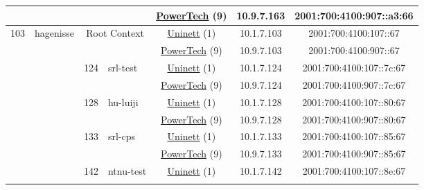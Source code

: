 \begin{small}
\begin{center}
\begin{longtable}{|c|c|c|c|c|c|c|c|}
  &  &  &  & \multicolumn{2}{|c|}{\tiny{\href{http://www.powertech.no}{PowerTech} (9)}} & \tiny{10.9.7.163} & \tiny{2001:700:4100:907::a3:66} \\ \hline
 \multirow{24}{*}{\tiny{103}} & \multicolumn{1}{|l|}{\multirow{24}{*}{\tiny{hagenisse}}} & \multicolumn{2}{|c|}{\multirow{2}{*}{\tiny{Root Context}}} & \multicolumn{2}{|c|}{\tiny{\href{https://www.uninett.no}{Uninett} (1)}} & \tiny{10.1.7.103} & \tiny{2001:700:4100:107::67} \\* \cline{5-5}\cline{6-6}\cline{7-7}\cline{8-8}
  &  & \multicolumn{2}{|c|}{} & \multicolumn{2}{|c|}{\tiny{\href{http://www.powertech.no}{PowerTech} (9)}} & \tiny{10.9.7.103} & \tiny{2001:700:4100:907::67} \\* \cline{3-3}\cline{4-4}\cline{5-5}\cline{6-6}\cline{7-7}\cline{8-8}
  &  & \multirow{2}{*}{\tiny{124}} & \multicolumn{1}{|l|}{\multirow{2}{*}{\tiny{srl-test}}} & \multicolumn{2}{|c|}{\tiny{\href{https://www.uninett.no}{Uninett} (1)}} & \tiny{10.1.7.124} & \tiny{2001:700:4100:107::7c:67} \\* \cline{5-5}\cline{6-6}\cline{7-7}\cline{8-8}
  &  &  &  & \multicolumn{2}{|c|}{\tiny{\href{http://www.powertech.no}{PowerTech} (9)}} & \tiny{10.9.7.124} & \tiny{2001:700:4100:907::7c:67} \\* \cline{3-3}\cline{4-4}\cline{5-5}\cline{6-6}\cline{7-7}\cline{8-8}
  &  & \multirow{2}{*}{\tiny{128}} & \multicolumn{1}{|l|}{\multirow{2}{*}{\tiny{hu-luiji}}} & \multicolumn{2}{|c|}{\tiny{\href{https://www.uninett.no}{Uninett} (1)}} & \tiny{10.1.7.128} & \tiny{2001:700:4100:107::80:67} \\* \cline{5-5}\cline{6-6}\cline{7-7}\cline{8-8}
  &  &  &  & \multicolumn{2}{|c|}{\tiny{\href{http://www.powertech.no}{PowerTech} (9)}} & \tiny{10.9.7.128} & \tiny{2001:700:4100:907::80:67} \\* \cline{3-3}\cline{4-4}\cline{5-5}\cline{6-6}\cline{7-7}\cline{8-8}
  &  & \multirow{2}{*}{\tiny{133}} & \multicolumn{1}{|l|}{\multirow{2}{*}{\tiny{srl-cps}}} & \multicolumn{2}{|c|}{\tiny{\href{https://www.uninett.no}{Uninett} (1)}} & \tiny{10.1.7.133} & \tiny{2001:700:4100:107::85:67} \\* \cline{5-5}\cline{6-6}\cline{7-7}\cline{8-8}
  &  &  &  & \multicolumn{2}{|c|}{\tiny{\href{http://www.powertech.no}{PowerTech} (9)}} & \tiny{10.9.7.133} & \tiny{2001:700:4100:907::85:67} \\* \cline{3-3}\cline{4-4}\cline{5-5}\cline{6-6}\cline{7-7}\cline{8-8}
  &  & \multirow{2}{*}{\tiny{142}} & \multicolumn{1}{|l|}{\multirow{2}{*}{\tiny{ntnu-test}}} & \multicolumn{2}{|c|}{\tiny{\href{https://www.uninett.no}{Uninett} (1)}} & \tiny{10.1.7.142} & \tiny{2001:700:4100:107::8e:67} \\* \cline{5-5}\cline{6-6}\cline{7-7}\cline{8-8}

\end{longtable}
\end{center}
\end{small}
